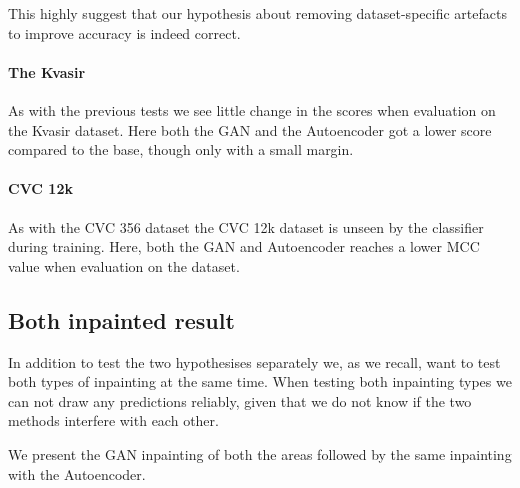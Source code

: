 This highly suggest that our hypothesis about removing dataset-specific artefacts to improve accuracy is indeed correct. 

\paragraph{The Kvasir}
As with the previous tests we see little change in the scores when evaluation on the Kvasir dataset.
Here both the GAN and the Autoencoder got a lower score compared to the base, though only with a small margin.


\paragraph{CVC 12k}
As with the CVC 356 dataset the CVC 12k dataset is unseen by the classifier during training. 
Here, both the GAN and Autoencoder reaches a lower MCC value when evaluation on the dataset. 
















































\subsection{Both inpainted result}

In addition to test the two hypothesises separately we, as we recall, want to test both types of inpainting at the same time.
When testing both inpainting types we can not draw any predictions reliably, given that we do not know if the two methods interfere with each other. 

We present the GAN inpainting of both the areas followed by the same inpainting with the Autoencoder.


